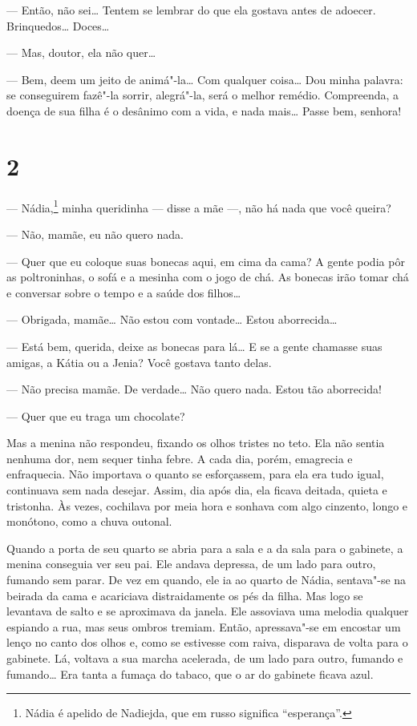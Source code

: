 --- Então, não sei\ldots{} Tentem se lembrar do que ela gostava antes de
adoecer. Brinquedos\ldots{} Doces\ldots{}

--- Mas, doutor, ela não quer\ldots{}

--- Bem, deem um jeito de animá"-la\ldots{} Com qualquer coisa\ldots{} Dou minha
palavra: se conseguirem fazê"-la sorrir, alegrá"-la, será o melhor
remédio. Compreenda, a doença de sua filha é o desânimo com a vida, e
nada mais\ldots{} Passe bem, senhora!

\section{2}

--- Nádia,\footnote{Nádia é apelido de Nadiejda, que em russo
  significa ``esperança''.} minha queridinha --- disse a mãe ---, não há
nada que você queira?

--- Não, mamãe, eu não quero nada.

--- Quer que eu coloque suas bonecas aqui, em cima da cama? A gente
podia pôr as poltroninhas, o sofá e a mesinha com o jogo de chá. As
bonecas irão tomar chá e conversar sobre o tempo e a saúde dos filhos\ldots{}

--- Obrigada, mamãe\ldots{} Não estou com vontade\ldots{} Estou aborrecida\ldots{}

--- Está bem, querida, deixe as bonecas para lá\ldots{} E se a gente chamasse
suas amigas, a Kátia ou a Jenia? Você gostava tanto delas.

--- Não precisa mamãe. De verdade\ldots{} Não quero nada. Estou tão
aborrecida!

--- Quer que eu traga um chocolate?

Mas a menina não respondeu, fixando os olhos tristes no teto. Ela não
sentia nenhuma dor, nem sequer tinha febre. A cada dia, porém, emagrecia
e enfraquecia. Não importava o quanto se esforçassem, para ela era tudo
igual, continuava sem nada desejar. Assim, dia após dia, ela ficava
deitada, quieta e tristonha. Às vezes, cochilava por meia hora e sonhava com algo cinzento, longo e monótono, como a chuva outonal.

Quando a porta de seu quarto se abria para a sala e a da sala para o
gabinete, a menina conseguia ver seu pai. Ele andava depressa, de um
lado para outro, fumando sem parar. De vez em quando, ele ia ao quarto
de Nádia, sentava"-se na beirada da cama e acariciava distraidamente os
pés da filha. Mas logo se levantava de salto e se aproximava da janela.
Ele assoviava uma melodia qualquer espiando a rua, mas seus ombros
tremiam. Então, apressava"-se em encostar um lenço no canto dos olhos e,
como se estivesse com raiva, disparava de volta para o gabinete. Lá,
voltava a sua marcha acelerada, de um lado para outro, fumando e
fumando\ldots{} Era tanta a fumaça do tabaco, que o ar do gabinete ficava azul.

